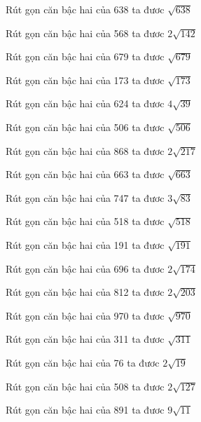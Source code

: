 \documentclass[12pt,a4paper]{article}
\begin{document}
\begin{ex}
Rút gọn căn bậc hai của 638 ta đươc $\sqrt{638}$
\end{ex}
\begin{ex}
Rút gọn căn bậc hai của 568 ta đươc $2\sqrt{142}$
\end{ex}
\begin{ex}
Rút gọn căn bậc hai của 679 ta đươc $\sqrt{679}$
\end{ex}
\begin{ex}
Rút gọn căn bậc hai của 173 ta đươc $\sqrt{173}$
\end{ex}
\begin{ex}
Rút gọn căn bậc hai của 624 ta đươc $4\sqrt{39}$
\end{ex}
\begin{ex}
Rút gọn căn bậc hai của 506 ta đươc $\sqrt{506}$
\end{ex}
\begin{ex}
Rút gọn căn bậc hai của 868 ta đươc $2\sqrt{217}$
\end{ex}
\begin{ex}
Rút gọn căn bậc hai của 663 ta đươc $\sqrt{663}$
\end{ex}
\begin{ex}
Rút gọn căn bậc hai của 747 ta đươc $3\sqrt{83}$
\end{ex}
\begin{ex}
Rút gọn căn bậc hai của 518 ta đươc $\sqrt{518}$
\end{ex}
\begin{ex}
Rút gọn căn bậc hai của 191 ta đươc $\sqrt{191}$
\end{ex}
\begin{ex}
Rút gọn căn bậc hai của 696 ta đươc $2\sqrt{174}$
\end{ex}
\begin{ex}
Rút gọn căn bậc hai của 812 ta đươc $2\sqrt{203}$
\end{ex}
\begin{ex}
Rút gọn căn bậc hai của 970 ta đươc $\sqrt{970}$
\end{ex}
\begin{ex}
Rút gọn căn bậc hai của 311 ta đươc $\sqrt{311}$
\end{ex}
\begin{ex}
Rút gọn căn bậc hai của 76 ta đươc $2\sqrt{19}$
\end{ex}
\begin{ex}
Rút gọn căn bậc hai của 508 ta đươc $2\sqrt{127}$
\end{ex}
\begin{ex}
Rút gọn căn bậc hai của 891 ta đươc $9\sqrt{11}$
\end{ex}
\end{document}
